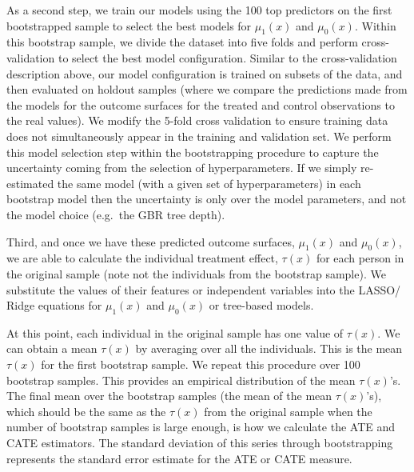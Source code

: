 \documentclass[12pt, a4paper]{article}
\begin{document}
As a second step, we train our models using the 100 top predictors on the first bootstrapped sample to select the best models for $\mu _1(x)$ and $\mu _0(x)$. Within this bootstrap sample, we divide the dataset into five folds and perform cross-validation to select the best model configuration. Similar to the cross-validation description above, our model configuration is trained on subsets of the data, and then evaluated on holdout samples (where we compare the predictions made from the models for the outcome surfaces for the treated and control observations to the real values). We modify the 5-fold cross validation to ensure training data does not simultaneously appear in the training and validation set. We perform this model selection step within the bootstrapping procedure to capture the uncertainty coming from the selection of hyperparameters. If we simply re-estimated the same model (with a given set of hyperparameters) in each bootstrap model then the uncertainty is only over the model parameters, and not the model choice (e.g.~the GBR tree depth).

Third, and once we have these predicted outcome surfaces, $\mu _1(x)$ and $\mu _0(x)$, we are able to calculate the individual treatment effect, $\tau(x)$ for each person in the original sample (note not the individuals from the bootstrap sample). We substitute the values of their features or independent variables into the LASSO/ Ridge equations for $\mu _1(x)$ and $\mu _0(x)$ or tree-based models.

At this point, each individual in the original sample has one value of $\tau(x)$. We can obtain a mean $\tau(x)$ by averaging over all the individuals. This is the mean $\tau(x)$ for the first bootstrap sample. We repeat this procedure over 100 bootstrap samples. This provides an empirical distribution of the mean $\tau(x)$'s. The final mean over the bootstrap samples (the mean of the mean $\tau(x)$'s), which should be the same as the $\tau(x)$ from the original sample when the number of bootstrap samples is large enough, is how we calculate the ATE and CATE estimators. The standard deviation of this series through bootstrapping represents the standard error estimate for the ATE or CATE measure.
\end{document}
